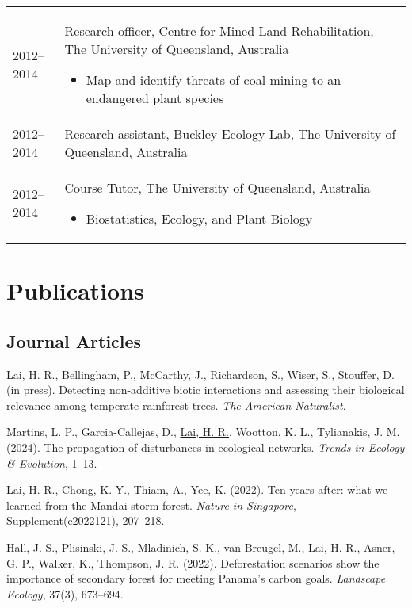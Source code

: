 \documentclass[a4paper]{article}
\begin{document}
\begin{tabular}{p{0.13\linewidth} p{0.87\linewidth}}
2012--2014 & Research officer, Centre for Mined Land Rehabilitation, The University of Queensland, Australia
\begin{itemize} 
\item Map and identify threats of coal mining to an endangered plant species
\end{itemize} \\

2012--2014 & Research assistant, Buckley Ecology Lab, The University of Queensland, Australia \\

2012--2014 & Course Tutor, The University of Queensland, Australia
\begin{itemize} 
\item Biostatistics, Ecology, and Plant Biology
\end{itemize} \\

\end{tabular}


\section*{Publications}

\subsection*{Journal Articles}

\hangindent=1cm \underline{Lai, H. R.}, Bellingham, P., McCarthy, J., Richardson, S., Wiser, S., Stouffer, D. (in press). Detecting non-additive biotic interactions and assessing their biological relevance among temperate rainforest trees. \textit{The American Naturalist}. 

\hangindent=1cm Martins, L. P., Garcia-Callejas, D., \underline{Lai, H. R.}, Wootton, K. L., Tylianakis, J. M. (2024). The propagation of disturbances in ecological networks. \textit{Trends in Ecology \& Evolution}, 1--13.

\hangindent=1cm  \underline{Lai, H. R.}, Chong, K. Y., Thiam, A., Yee, K. (2022). Ten years after: what we learned from the Mandai storm forest. \textit{Nature in Singapore}, Supplement(e2022121), 207--218.

\hangindent=1cm Hall, J. S., Plisinski, J. S., Mladinich, S. K., van Breugel, M., \underline{Lai, H. R.}, Asner, G. P., Walker, K., Thompson, J. R. (2022). Deforestation scenarios show the importance of secondary forest for meeting Panama’s carbon goals. \textit{Landscape Ecology}, 37(3), 673--694.
\end{document}
